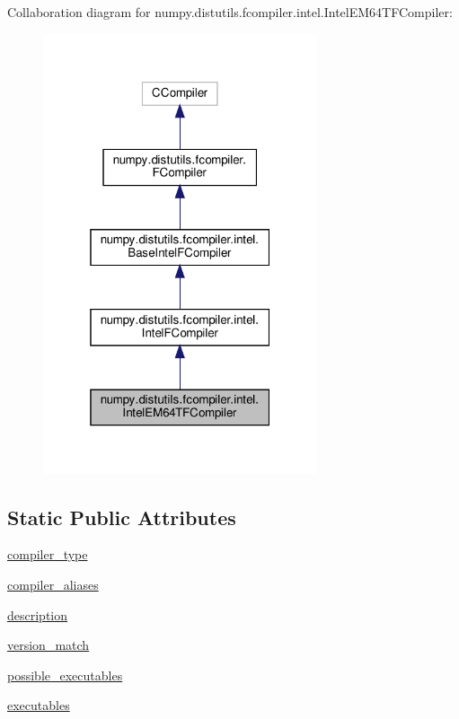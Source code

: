 Collaboration diagram for numpy.\+distutils.\+fcompiler.\+intel.\+Intel\+E\+M64\+T\+F\+Compiler\+:
\nopagebreak
\begin{figure}[H]
\begin{center}
\leavevmode
\includegraphics[width=229pt]{classnumpy_1_1distutils_1_1fcompiler_1_1intel_1_1IntelEM64TFCompiler__coll__graph}
\end{center}
\end{figure}
\subsection*{Static Public Attributes}
\begin{DoxyCompactItemize}
\item 
\hyperlink{classnumpy_1_1distutils_1_1fcompiler_1_1intel_1_1IntelEM64TFCompiler_adfb61a1b28d8c06ee784e36f0e6a7062}{compiler\+\_\+type}
\item 
\hyperlink{classnumpy_1_1distutils_1_1fcompiler_1_1intel_1_1IntelEM64TFCompiler_a71d2c327b3099078c6ebaa7c11be2f8a}{compiler\+\_\+aliases}
\item 
\hyperlink{classnumpy_1_1distutils_1_1fcompiler_1_1intel_1_1IntelEM64TFCompiler_aea55c0bc8102020d8ca4661f81e34583}{description}
\item 
\hyperlink{classnumpy_1_1distutils_1_1fcompiler_1_1intel_1_1IntelEM64TFCompiler_a0016d19781d00ee8f835515118732c26}{version\+\_\+match}
\item 
\hyperlink{classnumpy_1_1distutils_1_1fcompiler_1_1intel_1_1IntelEM64TFCompiler_af167a919877fbc7141c8811edf95b92a}{possible\+\_\+executables}
\item 
\hyperlink{classnumpy_1_1distutils_1_1fcompiler_1_1intel_1_1IntelEM64TFCompiler_ad722d4957045b6fa3aeadf7f9635ba0a}{executables}
\end{DoxyCompactItemize}
